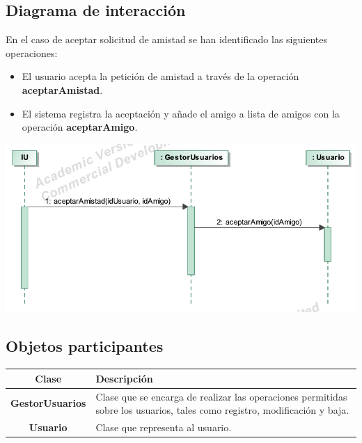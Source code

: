 \documentclass[12pt, a4paper, titlepage]{article}
\begin{document}
\subsection{Diagrama de interacción}

En el caso de {\sc aceptar solicitud de amistad } se han identificado las siguientes operaciones:

\begin{itemize}
	\item El usuario acepta la petición de amistad a través de la operación \textbf{aceptarAmistad}.
	\item El sistema registra la aceptación y añade el amigo a lista de amigos con la operación \textbf{aceptarAmigo}.
\end{itemize}

\begin{center}
	\includegraphics{Imagenes/OperacionAceptarAmistad}
\end{center}



\subsection{Objetos participantes}

\begin{center}

\begin{tabular}{|c|p{14cm}|}
	\hline
	\textbf{Clase} & \textbf{Descripción}\\ \hline
	\textbf{GestorUsuarios} &  Clase que se encarga de realizar las operaciones permitidas sobre los usuarios, tales como registro, modificación y baja.\\ \hline
	\textbf{Usuario} & Clase que representa al usuario. \\ \hline
\end{tabular}

\end{center}
\end{document}
